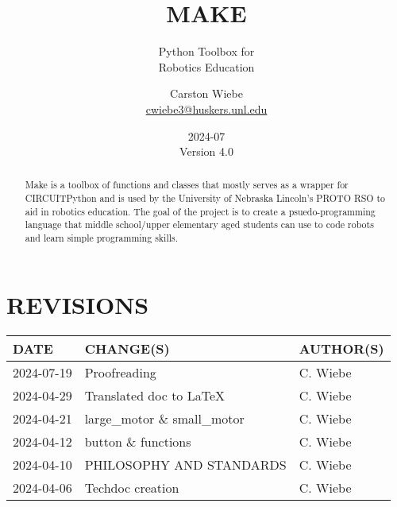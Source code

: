 \documentclass[12pt]{scrartcl} %
\title{MAKE}
\subtitle{
  Python Toolbox for \\
  Robotics Education
}
\author{
  Carston Wiebe \\
  \href{mailto:cwiebe3@huskers.unl.edu}{cwiebe3@huskers.unl.edu} \\
}
\date{
  2024-07 \\
  Version 4.0
}
\begin{document}

\maketitle
\thispagestyle{empty}

\vfill

\begin{abstract}
  Make is a toolbox of functions and classes that mostly serves as a wrapper
  for CIRCUITPython and is used by the University of Nebraska Lincoln's PROTO
  RSO to aid in robotics education. The goal of the project is to create a
  psuedo-programming language that middle school/upper elementary aged students
  can use to code robots and learn simple programming skills.
\end{abstract}

\newpage
\clearpage

\section*{REVISIONS}

\begin{table}[ht]
  \centering
  \def\arraystretch{1.5}
  \begin{tabular}{|l|l|l|}
    \hline
    DATE       & CHANGE(S)                    & AUTHOR(S) \\
    \hline
    2024-07-19 & Proofreading                 & C. Wiebe  \\
    \hline
    2024-04-29 & Translated doc to LaTeX      & C. Wiebe  \\
    \hline
    2024-04-21 & large\_motor \& small\_motor & C. Wiebe  \\
    \hline
    2024-04-12 & button \& functions          & C. Wiebe  \\
    \hline
    2024-04-10 & PHILOSOPHY AND STANDARDS     & C. Wiebe  \\
    \hline
    2024-04-06 & Techdoc creation             & C. Wiebe  \\
    \hline
  \end{tabular}
\end{table}

\newpage
\end{document}
